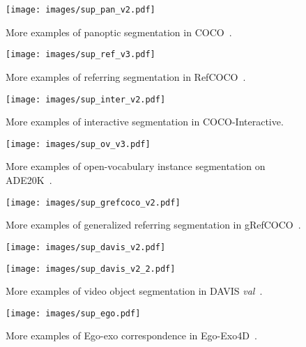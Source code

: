 \begin{figure}[!t]
  \centering
  \texttt{[image: images/sup\_pan\_v2.pdf]}
  \caption{More examples of panoptic segmentation in COCO~\cite{coco}.}
  \label{fig:panoptic}
\end{figure}
\begin{figure}[!t]
  \centering
  \texttt{[image: images/sup\_ref\_v3.pdf]}
  \caption{More examples of referring segmentation in RefCOCO~\cite{refcoco}.}
  \label{fig:refer}
\end{figure}
\begin{figure}[!t]
  \centering
  \texttt{[image: images/sup\_inter\_v2.pdf]}
  \caption{More examples of interactive segmentation in COCO-Interactive.}
  \label{fig:interactive}
\end{figure}
\begin{figure}[!t]
  \centering
  \texttt{[image: images/sup\_ov\_v3.pdf]}
  \caption{More examples of open-vocabulary instance segmentation on ADE20K~\cite{ade20k}.}
  \label{fig:ov}
\end{figure}
\begin{figure}[!t]
  \centering
  \texttt{[image: images/sup\_grefcoco\_v2.pdf]}
  \caption{More examples of generalized referring segmentation in gRefCOCO~\cite{grefcoco}.}
  \label{fig:grefcoco}
\end{figure}
\begin{figure}[!t]
  \centering
  \texttt{[image: images/sup\_davis\_v2.pdf]}
  \label{fig:davis}
\end{figure}
\begin{figure}[!t]
  \centering
  \texttt{[image: images/sup\_davis\_v2\_2.pdf]}
  \caption{More examples of video object segmentation in DAVIS \textit{val}~\cite{davis}.}
  \label{fig:davis}
\end{figure}
\begin{figure}[!t]
  \centering
  \texttt{[image: images/sup\_ego.pdf]}
  \caption{More examples of Ego-exo correspondence in Ego-Exo4D~\cite{egoexo}.}
  \label{fig:Ego-Exo4D}
\end{figure}

